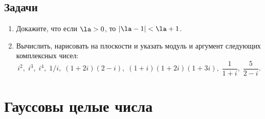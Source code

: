 \subsection*{Задачи}

\begin{enumerate}
\item Докажите, что если $\la>0$, то $|\la-1|<\la+1$.
\item Вычислить, нарисовать на плоскости и указать модуль и аргумент следующих комплексных чисел:
$$
i^2,\;i^3,\;i^4,\;1/i,\;(1+2i)(2-i),\;(1+i)(1+2i)(1+3i),\;\frac{1}{1+i},\;\frac{5}{2-i}.
$$
\end{enumerate}


\section{Гауссовы целые числа}


